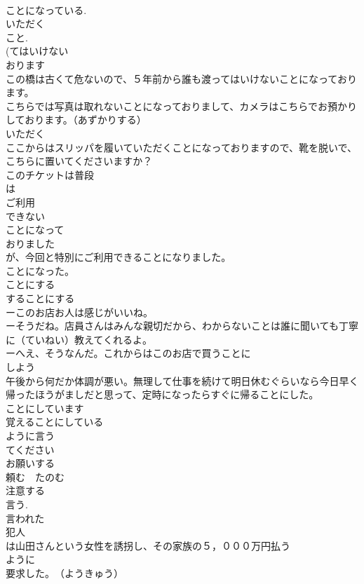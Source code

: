 \documentclass[8pt]{extreport}
\begin{document}
\begin{CJK}{UTF8}{min}
\\	ことになっている. 
\\	いただく 
\\	こと. 
\\	(てはいけない 
\\	おります 
\\	この橋は古くて危ないので、５年前から誰も渡ってはいけないことになっております。
\\	こちらでは写真は取れないことになっておりまして、カメラはこちらでお預かりしております。（あずかりする）
\\	いただく 
\\	ここからはスリッパを履いていただくことになっておりますので、靴を脱いで、こちらに置いてくださいますか？
\\	このチケットは普段
\\	は
\\	ご利用
\\	できない
\\	ことになって
\\	おりました
\\	が、今回と特別にご利用できることになりました。
\\	ことになった。
\\	ことにする
\\	することにする 
\\	ーこのお店お人は感じがいいね。
\\	ーそうだね。店員さんはみんな親切だから、わからないことは誰に聞いても丁寧に（ていねい）教えてくれるよ。
\\	ーへえ、そうなんだ。これからはこのお店で買うことに
\\	しよう
\\	午後から何だか体調が悪い。無理して仕事を続けて明日休むぐらいなら今日早く帰ったほうがましだと思って、定時になったらすぐに帰ることにした。
\\	ことにしています
\\	覚えることにしている　
\\	ように言う
\\	てください　
\\	お願いする
\\	頼む　たのむ 
\\	注意する 
\\	言う.
\\	言われた　
\\	犯人
\\	は山田さんという女性を誘拐し、その家族の５，０００万円払う
\\	ように
\\	要求した。　（ようきゅう）

\end{CJK}
\end{document}
